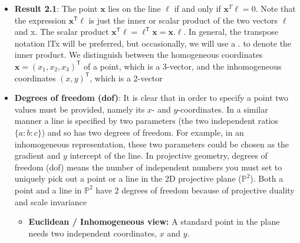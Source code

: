\documentclass{report}
\begin{document}
\begin{itemize}
            \bigbreak \noindent 
            Note that for any non-zero constant $k$ and line $\mathbf{\ell}$ the equation $(kx, ky, k)\ell=0$ if and only if $(x, y, 1)\ell=0$. It is natural, therefore, to consider the set of vectors $(kx, ky, k)^{\mathsf{T}}$ for varying values of $k$ to be a representation of the point $(x, y)^{\mathsf{T}}$ in $\mathbb{R}^{2}$. Thus, just as with lines, points are represented by homogeneous vectors
            \bigbreak \noindent 
            An arbitrary homogeneous vector representative of a point is of the form $\mathbf{x}=(x_{1}, x_{2}, x_{3})^{\mathsf{T}}$, representing the point $(x_{1}/x_{3}, x_{2}/x_{3})^{\mathsf{T}}$ in $\mathbb{R}^{2}$. Points, then, as homogeneous vectors are also elements of $\mathbb{P}^{2}$. One has a simple equation to determine when a point lies on a line, namely
        \item \textbf{Result 2.1}: The point $\mathbf{x}$ lies on the line $\mathbf{\ell}$ if and only if $\mathbf{x}^{T}\ell = 0$.
            \bigbreak \noindent 
            Note that the expression $\mathbf{x}^{\mathsf{T}}\mathbf{\ell}$ is just the inner or scalar product of the two vectors $\ell$ and x. The scalar product $\mathbf{x}^{\mathsf{T}}\ell=\ell^{\mathsf{T}}\mathbf{x}=\mathbf{x}.\ell$. In general, the transpose notation lTx will be preferred, but occasionally, we will use a $.$ to denote the inner product. We distinguish between the homogeneous coordinates $\mathbf{x}=(x_{1}, x_{2}, x_{3})^{\mathsf{T}}$ of a point, which is a 3-vector, and the inhomogeneous coordinates $(x, y)^{\mathsf{T}}$, which is a 2-vector
        \item \textbf{Degrees of freedom (dof)}:  It is clear that in order to specify a point two values must be provided, namely its $x$- and $y$-coordinates. In a similar manner a line is specified by two parameters (the two independent ratios $\{a:b:c\}$) and so has two degrees of freedom. For example, in an inhomogeneous representation, these two parameters could be chosen as the gradient and $y$ intercept of the line.
            \bigbreak \noindent 
            In projective geometry, degrees of freedom (dof) means the number of independent numbers you must set to uniquely pick out a point or a line in the 2D projective plane (\(\mathbb{P}^{2}\)). Both a point and a line in \(\mathbb{P}^{2}\) have 2 degrees of freedom because of projective duality and scale invariance
            \begin{itemize}
                \item \textbf{Euclidean / Inhomogeneous view:} A standard point in the plane needs two independent coordinates, \(x\) and \(y\).

\end{itemize}
\end{itemize}
\end{document}
